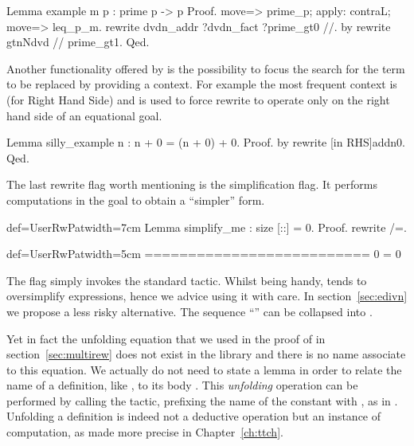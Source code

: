 \begin{coq}{}{}
Lemma example m p : prime p -> p %
Proof.
move=> prime_p; apply: contraL; move=> leq_p_m.
rewrite dvdn_addr ?dvdn_fact ?prime_gt0 //.
by rewrite gtnNdvd // prime_gt1.
Qed.
\end{coq}

Another functionality offered by  is the possibility
to focus the search for the term to be replaced by providing a
context.  For example the most frequent context is  (for Right
Hand Side) and is used to force rewrite to operate only on the right
hand side of an equational goal.

\begin{coq}{}{}
Lemma silly_example n : n + 0 = (n + 0) + 0.
Proof. by rewrite [in RHS]addn0. Qed.
\end{coq}


The last rewrite flag worth mentioning is the \C{/=} simplification
flag.  It performs computations in the goal to obtain a ``simpler'' form.

\begin{coq}{def=UserRwPat}{width=7cm}
Lemma simplify_me : size [::] = 0.
Proof.
rewrite /=.
\end{coq}
\begin{coqout}{def=UserRwPat}{width=5cm}
==========================
0 = 0
\end{coqout}
The \C{/=} flag simply invokes the \Coq{} standard 
tactic.  Whilst being handy,  tends to oversimplify
expressions, hence we advice using it with care.
In section~\ref{sec:edivn} we propose a less risky alternative.
The sequence ``\C{// /=}'' can be collapsed into \C{//=}.

Yet in fact the unfolding equation  that we used in
the proof of  in section~\ref{sec:multirew}
does not exist in the library and there is no name associate to this
equation. We actually do not need to state a lemma in order to relate
the name of a definition, like , to its body
. This \emph{unfolding} operation can be
performed by calling the  tactic, prefixing the name of the
constant with \C{/}, as in . Unfolding a definition is
indeed not a deductive operation but an instance of computation, as
made more precise in Chapter~\ref{ch:ttch}.

